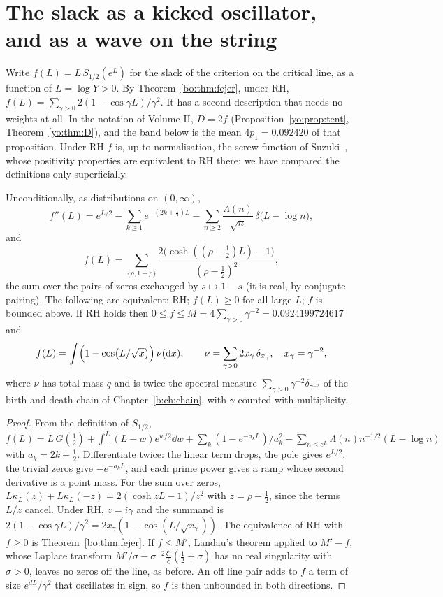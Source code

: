 \section{The slack as a kicked oscillator, and as a wave on the string}\label{bo:sec:osc}

Write $f(L)=L\,S_{1/2}(e^{L})$ for the slack of the criterion on the critical line, as a function of $L=\log Y>0$. By Theorem~\ref{bo:thm:fejer}, under RH, $f(L)=\sum_{\gamma>0}2(1-\cos\gamma L)/\gamma^2$. It has a second description that needs no weights at all. In the notation of Volume II, $D=2f$ (Proposition~\ref{yo:prop:tent}, Theorem~\ref{yo:thm:D}), and the band below is the mean $4p_1=0.092420$ of that proposition. Under RH $f$ is, up to normalisation, the screw function of Suzuki~\cite{Suzuki22}, whose positivity properties are equivalent to RH there; we have compared the definitions only superficially. %

\begin{theorem}[Oscillator]\label{bo:thm:osc}
Unconditionally, as distributions on $(0,\infty)$,
\[
f''(L)=e^{L/2}-\sum_{k\ge1}e^{-(2k+\frac12)L}-\sum_{n\ge2}\frac{\Lambda(n)}{\sqrt n}\,\delta\bigl(L-\log n\bigr),
\]
and
\[
f(L)=\sum_{\{\rho,1-\rho\}}\frac{2\bigl(\cosh((\rho-\frac12)L)-1\bigr)}{(\rho-\frac12)^2},
\]
the sum over the pairs of zeros exchanged by $s\mapsto1-s$ (it is real, by conjugate pairing). The following are equivalent: RH; $f(L)\ge0$ for all large $L$; $f$ is bounded above. If RH holds then $0\le f\le M=4\sum_{\gamma>0}\gamma^{-2}=0.0924199724617$ and
\[
f(L)=\int\Bigl(1-\cos\bigl(L/\sqrt x\bigr)\Bigr)\,\nu(\mathrm{d} x),\qquad \nu=\sum_{\gamma>0}2x_\gamma\,\delta_{x_\gamma},\quad x_\gamma=\gamma^{-2},
\]
where $\nu$ has total mass $q$ and is twice the spectral measure $\sum_{\gamma>0}\gamma^{-2}\delta_{\gamma^{-2}}$ of the birth and death chain of Chapter~\ref{b:ch:chain}, with $\gamma$ counted with multiplicity.
\end{theorem}

\begin{proof}
From the definition of $S_{1/2}$, $f(L)=L\,G(\frac12)+\int_0^L(L-w)e^{w/2}\dd w+\sum_k(1-e^{-a_kL})/a_k^2-\sum_{n\le e^L}\Lambda(n)n^{-1/2}(L-\log n)$ with $a_k=2k+\frac12$. Differentiate twice: the linear term drops, the pole gives $e^{L/2}$, the trivial zeros give $-e^{-a_kL}$, and each prime power gives a ramp whose second derivative is a point mass. For the sum over zeros, $L\kappa_L(z)+L\kappa_L(-z)=2(\cosh zL-1)/z^2$ with $z=\rho-\frac12$, since the terms $L/z$ cancel. Under RH, $z=i\gamma$ and the summand is $2(1-\cos\gamma L)/\gamma^2=2x_\gamma(1-\cos(L/\sqrt{x_\gamma}))$. The equivalence of RH with $f\ge0$ is Theorem~\ref{bo:thm:fejer}. If $f\le M'$, Landau's theorem applied to $M'-f$, whose Laplace transform $M'/\sigma-\sigma^{-2}\frac{\xi'}{\xi}(\frac12+\sigma)$ has no real singularity with $\sigma>0$, leaves no zeros off the line, as before. An off line pair adds to $f$ a term of size $e^{dL}/\gamma^2$ that oscillates in sign, so $f$ is then unbounded in both directions.
\end{proof}

